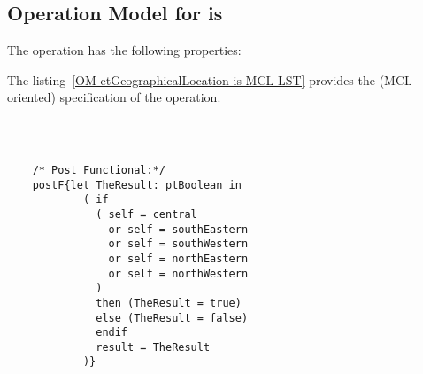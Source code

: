 \subsection{Operation Model for is}

\label{OM-is}


The  operation has the following properties:

	\begin{operationmodel}



		


	\end{operationmodel}



	\vspace{1cm}
	The listing~\ref{OM-etGeographicalLocation-is-MCL-LST} provides the \msrmessir (MCL-oriented) specification of the operation.
	
	\scriptsize
	\vspace{0.5cm}
	\begin{lstlisting}[style=MessirStyle,firstnumber=auto,captionpos=b,caption={\msrmessir (MCL-oriented) specification of the operation \emph{is}.},label=OM-etGeographicalLocation-is-MCL-LST]

	
	
	/* Post Functional:*/ 
	postF{let TheResult: ptBoolean in
	        ( if
	          ( self = central
	            or self = southEastern
	            or self = southWestern
	            or self = northEastern
	            or self = northWestern
	          )
	          then (TheResult = true)
	          else (TheResult = false)
	          endif
	          result = TheResult
	        )}
	
	
	\end{lstlisting}
	\normalsize 
	
	
	
	





